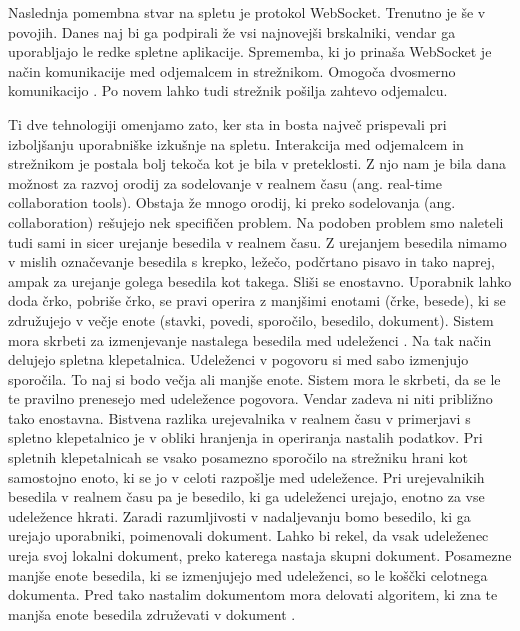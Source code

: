 \documentclass[a4paper, 12pt, twoside]{book}
\begin{document}
Naslednja pomembna stvar na spletu je protokol WebSocket. Trenutno je še v povojih. Danes naj bi ga podpirali že vsi najnovejši brskalniki, vendar ga uporabljajo le redke spletne aplikacije. Sprememba, ki jo prinaša WebSocket je način komunikacije med odjemalcem in strežnikom. Omogoča dvosmerno komunikacijo \cite{wave-cs}. Po novem lahko tudi strežnik pošilja zahtevo odjemalcu.

Ti dve tehnologiji omenjamo zato, ker sta in bosta največ prispevali pri izboljšanju uporabniške izkušnje na spletu. Interakcija med odjemalcem in strežnikom je postala bolj tekoča kot je bila v preteklosti. Z njo nam je bila dana možnost za razvoj orodij za sodelovanje v realnem času (ang. real-time collaboration tools). Obstaja že mnogo orodij, ki preko sodelovanja (ang. collaboration) rešujejo nek specifičen problem. Na podoben problem smo naleteli tudi sami in sicer urejanje besedila v realnem času. Z urejanjem besedila nimamo v mislih označevanje besedila s krepko, ležečo, podčrtano pisavo in tako naprej, ampak za urejanje golega besedila kot takega. Sliši se enostavno. Uporabnik lahko doda črko, pobriše črko, se pravi operira z manjšimi enotami (črke, besede), ki se združujejo v večje enote (stavki, povedi, sporočilo, besedilo, dokument). Sistem mora skrbeti za izmenjevanje nastalega besedila med udeleženci \cite{gdocs23}. Na tak način delujejo spletna klepetalnica. Udeleženci v pogovoru si med sabo izmenjujo sporočila. To naj si bodo večja ali manjše enote. Sistem mora le skrbeti, da se le te pravilno prenesejo med udeležence pogovora. Vendar zadeva ni niti približno tako enostavna. Bistvena razlika urejevalnika v realnem času v primerjavi s spletno klepetalnico je v obliki hranjenja in operiranja nastalih podatkov. Pri spletnih klepetalnicah se vsako posamezno sporočilo na strežniku hrani kot samostojno enoto, ki se jo v celoti razpošlje med udeležence. Pri urejevalnikih besedila v realnem času pa je besedilo, ki ga udeleženci urejajo, enotno za vse udeležence hkrati. Zaradi razumljivosti v nadaljevanju bomo besedilo, ki ga urejajo uporabniki, poimenovali dokument. Lahko bi rekel, da vsak udeleženec ureja svoj lokalni dokument, preko katerega nastaja skupni dokument. Posamezne manjše enote besedila, ki se izmenjujejo med udeleženci, so le koščki celotnega dokumenta. Pred tako nastalim dokumentom mora delovati algoritem, ki zna te manjša enote besedila združevati v dokument \cite{gdocs22}.

\end{document}

